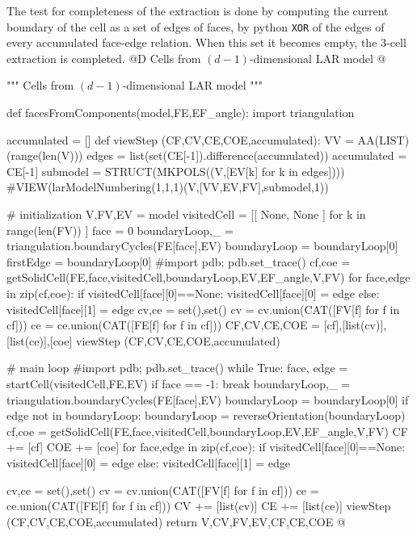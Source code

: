 \documentclass[11pt,oneside]{article}    %
\begin{document}
The test for completeness of the extraction is done by computing the current boundary of the cell as a set of edges of faces, by python \texttt{XOR} of the edges of every accumulated face-edge relation. When this set it becomes empty, the 3-cell extraction is completed.
@D Cells from $(d-1)$-dimensional LAR model
@{""" Cells from $(d-1)$-dimensional LAR model """

def facesFromComponents(model,FE,EF_angle):
    import triangulation

    accumulated = []
    def viewStep (CF,CV,CE,COE,accumulated):
        VV = AA(LIST)(range(len(V)))
        edges = list(set(CE[-1]).difference(accumulated))
        accumulated = CE[-1]
        submodel = STRUCT(MKPOLS((V,[EV[k] for k in edges])))
        #VIEW(larModelNumbering(1,1,1)(V,[VV,EV,FV],submodel,1))

    # initialization
    V,FV,EV = model
    visitedCell = [[ None, None ] for k in range(len(FV)) ]
    face = 0
    boundaryLoop,_ = triangulation.boundaryCycles(FE[face],EV)
    boundaryLoop = boundaryLoop[0]
    firstEdge = boundaryLoop[0]
    #import pdb; pdb.set_trace()
    cf,coe = getSolidCell(FE,face,visitedCell,boundaryLoop,EV,EF_angle,V,FV)
    for face,edge in zip(cf,coe):
        if visitedCell[face][0]==None: visitedCell[face][0] = edge
        else: visitedCell[face][1] = edge
    cv,ce = set(),set()
    cv = cv.union(CAT([FV[f] for f in cf]))
    ce = ce.union(CAT([FE[f] for f in cf]))
    CF,CV,CE,COE = [cf],[list(cv)],[list(ce)],[coe]
    viewStep (CF,CV,CE,COE,accumulated)
    
    # main loop
    #import pdb; pdb.set_trace()
    while True:
        face, edge = startCell(visitedCell,FE,EV)
        if face == -1: break
        boundaryLoop,_ = triangulation.boundaryCycles(FE[face],EV)
        boundaryLoop = boundaryLoop[0]
        if edge not in boundaryLoop:
            boundaryLoop = reverseOrientation(boundaryLoop)
        cf,coe = getSolidCell(FE,face,visitedCell,boundaryLoop,EV,EF_angle,V,FV)
        CF += [cf]
        COE += [coe]
        for face,edge in zip(cf,coe):
            if visitedCell[face][0]==None: visitedCell[face][0] = edge
            else: visitedCell[face][1] = edge
            
        cv,ce = set(),set()
        cv = cv.union(CAT([FV[f] for f in cf]))
        ce = ce.union(CAT([FE[f] for f in cf]))
        CV += [list(cv)]
        CE += [list(ce)]
        viewStep (CF,CV,CE,COE,accumulated)
    return V,CV,FV,EV,CF,CE,COE
@}
    
\end{document}
